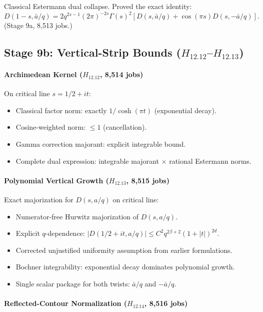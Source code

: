 \documentclass[11pt,a4paper]{article}
\theoremstyle{plain}
\theoremstyle{definition}
\theoremstyle{remark}
\begin{document}
Classical Estermann dual collapse. Proved the exact identity:
\[
D(1-s, \bar{a}/q) = 2q^{2s-1}(2\pi)^{-2s}\Gamma(s)^2 \left[ D(s, \bar{a}/q) + \cos(\pi s) D(s, -\bar{a}/q) \right].
\]
(Stage 9a, 8,513 jobs.)

\subsection{Stage 9b: Vertical-Strip Bounds ($H_{12.12}$--$H_{12.13}$)}

\paragraph{Archimedean Kernel ($H_{12.12}$, 8,514 jobs)}

On critical line $s = 1/2 + it$:
\begin{itemize}[leftmargin=2em]
  \item Classical factor norm: exactly $1/\cosh(\pi t)$ (exponential decay).
  \item Cosine-weighted norm: $\le 1$ (cancellation).
  \item Gamma correction majorant: explicit integrable bound.
  \item Complete dual expression: integrable majorant $\times$ rational Estermann norms.
\end{itemize}

\paragraph{Polynomial Vertical Growth ($H_{12.13}$, 8,515 jobs)}

Exact majorization for $D(s,a/q)$ on critical line:
\begin{itemize}[leftmargin=2em]
  \item Numerator-free Hurwitz majorization of $D(s,a/q)$.
  \item Explicit $q$-dependence: $|D(1/2+it,a/q)| \le C^2 q^{2\beta+2}(1+|t|)^{2d}$.
  \item Corrected unjustified uniformity assumption from earlier formulations.
  \item Bochner integrability: exponential decay dominates polynomial growth.
  \item Single scalar package for both twists: $\bar{a}/q$ and $-\bar{a}/q$.
\end{itemize}

\paragraph{Reflected-Contour Normalization ($H_{12.14}$, 8,516 jobs)}
\end{document}
